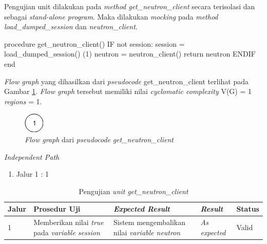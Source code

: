Pengujian unit dilakukan pada \emph{method get\_neutron\_client}
secara terisolasi dan sebagai \emph{stand-alone program}.  Maka
dilakukan \emph{mocking} pada \emph{method load\_dumped\_session} dan
\emph{neutron\_client}.

\begin{code}
\begin{ignasicblock}[title=get\_neutron\_client,minted language=text]
procedure get_neutron_client()
    IF not session:
        session = load_dumped_session()   (1)
        neutron = neutron_client()
        return neutron
    ENDIF
end
\end{ignasicblock}
\label{pc:get_neutron_client}
\end{code}

\par\null\par
\noindent
\emph{Flow graph} yang dihasilkan dari \emph{pseudocode}
get\_neutron\_client terlihat pada Gambar \ref{cfg:get_neutron_client}.
\emph{Flow graph} tersebut memiliki nilai \emph{cyclomatic complexity} V(G) = 1 \emph{regions} = 1.

\begin{figure}[H]
  \centering
  \includegraphics[width=.06\linewidth]{img/test-case/1node}
  \caption{\emph{Flow graph} dari \emph{pseudocode} \emph{get\_neutron\_client}}
  \label{cfg:get_neutron_client}
\end{figure}

\noindent
\emph{Independent Path}

\begin{enumerate}
\item Jalur 1 : 1
\end{enumerate}

\begin{longtable}{|P{.06\textwidth}|P{.30\textwidth}|P{.30\textwidth}|P{.10\textwidth}|P{.08\textwidth}|}
  \caption{Pengujian \emph{unit} \emph{get\_neutron\_client}} \label{jalur:get_neutron_client}\\
  \hline
  \textbf{Jalur} & \textbf{Prosedur Uji} & \textbf{\emph{Expected Result}}
  & \textbf{\emph{Result}} & \textbf{Status} \\\hline
  1 & Memberikan nilai \emph{true} pada  \emph{variable session}
                                             & Sistem mengembalikan nilai \emph{variable neutron}
  & \emph{As expected} & Valid \\\hline
\end{longtable}

